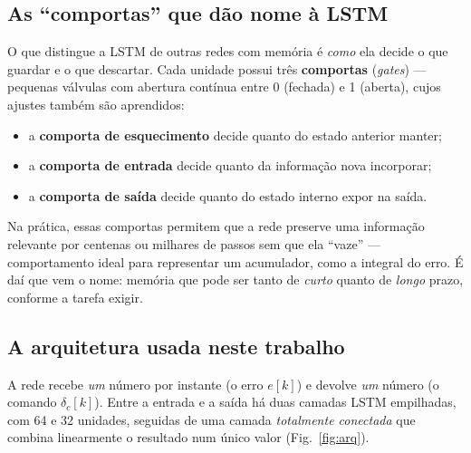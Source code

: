 \documentclass[11pt,a4paper]{article}
\begin{document}
\subsection{As ``comportas'' que dão nome à LSTM}

O que distingue a LSTM de outras redes com memória é \emph{como} ela decide o que
guardar e o que descartar. Cada unidade possui três \textbf{comportas} (\emph{gates}) ---
pequenas válvulas com abertura contínua entre 0 (fechada) e 1 (aberta), cujos ajustes
também são aprendidos:
\begin{itemize}
  \item a \textbf{comporta de esquecimento} decide quanto do estado anterior manter;
  \item a \textbf{comporta de entrada} decide quanto da informação nova incorporar;
  \item a \textbf{comporta de saída} decide quanto do estado interno expor na saída.
\end{itemize}
Na prática, essas comportas permitem que a rede preserve uma informação relevante por
centenas ou milhares de passos sem que ela ``vaze'' --- comportamento ideal para
representar um acumulador, como a integral do erro. É daí que vem o nome: memória que
pode ser tanto de \emph{curto} quanto de \emph{longo} prazo, conforme a tarefa exigir.

\subsection{A arquitetura usada neste trabalho}

A rede recebe \emph{um} número por instante (o erro $e[k]$) e devolve \emph{um} número
(o comando $\delta_c[k]$). Entre a entrada e a saída há duas camadas LSTM empilhadas, com
64 e 32 unidades, seguidas de uma camada \emph{totalmente conectada} que combina
linearmente o resultado num único valor (Fig.~\ref{fig:arq}).
\end{document}
